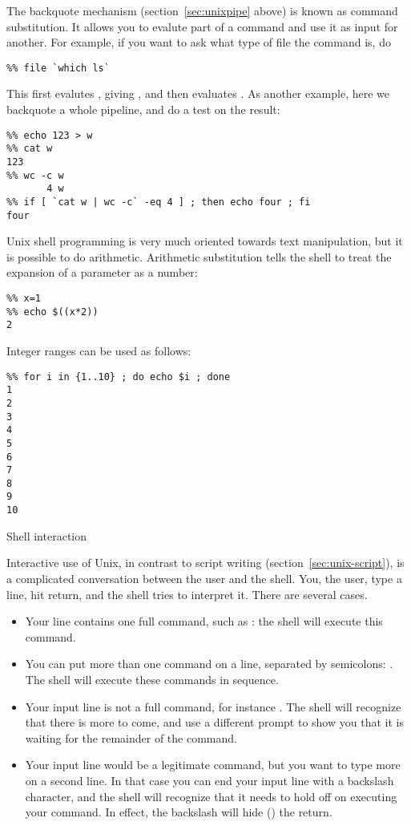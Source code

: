 \begin{comment}
There are ways of doing pattern matching and substitution 
on a variable:
\begin{verbatim}
%% f=x.fort
%% echo ${f%%.fort}
x
%% echo ${f%%.fort}.bak
x.bak
\end{verbatim}
\end{comment}

The backquote mechanism (section~\ref{sec:unixpipe} above)
is known as command substitution. It allows you to evalute part
of a command and use it as input for another. For example,
if you want to ask what type of file the command  is, do
\begin{verbatim}
%% file `which ls`
\end{verbatim}
This first evalutes , giving , and then
evaluates . As another example, here
we backquote a whole pipeline, and do a test on the result:
\begin{verbatim}
%% echo 123 > w
%% cat w
123
%% wc -c w
       4 w
%% if [ `cat w | wc -c` -eq 4 ] ; then echo four ; fi
four
\end{verbatim}

Unix shell programming is very much oriented towards text manipulation, but it 
is possible to do arithmetic. 
Arithmetic substitution tells the shell to treat the expansion of a
parameter as a number:
\begin{verbatim}
%% x=1
%% echo $((x*2))
2
\end{verbatim}

Integer ranges can be used as follows:
\begin{verbatim}
%% for i in {1..10} ; do echo $i ; done
1
2
3
4
5
6
7
8
9
10
\end{verbatim}

 {Shell interaction}

Interactive use of Unix, in contrast to script writing
(section~\ref{sec:unix-script}), is a complicated conversation between
the user and the shell. You, the user, type a line, hit return, and
the shell tries to interpret it. There are several cases.
\begin{itemize}
\item Your line contains one full command, such as : the
  shell will execute this command.
\item You can put more than one command on a line, separated by
  semicolons: . The shell will execute these
  commands in sequence.
\item Your input line is not a full command, for instance . The shell will recognize that there is more to come, and use
  a different prompt to show you that it is waiting for the remainder
  of the command.
\item Your input line would be a legitimate command, but you want to
  type more on a second line. In that case you can end your input line
  with a backslash character, and the shell will recognize that it
  needs to hold off on executing your command. In effect, the
  backslash will hide () the return.
\end{itemize}

